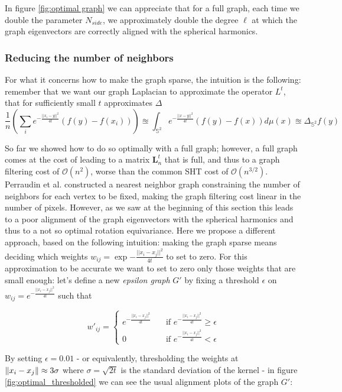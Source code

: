 In figure \ref{fig:optimal graph} we can appreciate that for a full graph, each time we double the parameter $N_{side}$, we approximately double the degree $\ell$ at which the graph eigenvectors are correctly aligned with the spherical harmonics.
\subsubsection{Reducing the number of neighbors}
For what it concerns how to make the graph sparse, the intuition is the following: remember that we want our graph Laplacian to approximate the operator $L^t$, that for sufficiently small $t$ approximates $\Delta$
$$\frac{1}{n}\left(\sum_i e^{-\frac{||x_i-y||^2}{4t}}(f(y)-f(x_i)) \right)  \approxeq  \int_{\mathbb S^2} e^{-\frac{||x-y||^2}{4t}}\left(f(y)-f(x)\right)d\mu(x) \approxeq \Delta_{\mathbb S^2} f(y)$$

So far we showed how to do so optimally with a full graph; however, a full graph comes at the cost of leading to a matrix $\mathbf L_n^t$ that is full, and thus to a graph filtering cost of $\mathcal O(n^2)$, worse than the common SHT cost of $\mathcal O(n^{3/2})$. Perraudin et al. \cite{DeepSphere} constructed a nearest neighbor graph constraining the number of neighbors for each vertex to be fixed, making the graph filtering cost linear in the number of pixels. However, as we saw at the beginning of this section this leads to a poor alignment of the graph eigenvectors with the spherical harmonics and thus to a not so optimal rotation equivariance. Here we propose a different approach, based on the following intuition: making the graph sparse means deciding which weights $w_{ij}=\exp{-\frac{||x_i-x_j||^2}{4t}}$ to set to zero. For this approximation to be accurate we want to set to zero only those weights that are small enough: let's define a new \textit{epsilon graph} $G'$ by fixing a threshold $\epsilon$ on $w_{ij}=e^{-\frac{||x_i-x_j||^2}{4t}}$ such that

$$w'_{ij} = \begin{cases}
e^{-\frac{||x_i-x_j||^2}{4t}}\quad& \text{if } e^{-\frac{||x_i-x_j||^2}{4t}} \geq \epsilon\\
0 \quad & \text{if } e^{-\frac{||x_i-x_j||^2}{4t}} < \epsilon
\end{cases}$$

By setting $\epsilon = 0.01$ - or equivalently, thresholding the weights at \\$\left\lVert x_i-x_j\right\rVert\approx 3\sigma$ where $\sigma=\sqrt{2t}$ is the standard deviation of the kernel - in figure \ref{fig:optimal_thresholded} we can see the usual alignment plots of the graph $G'$:


